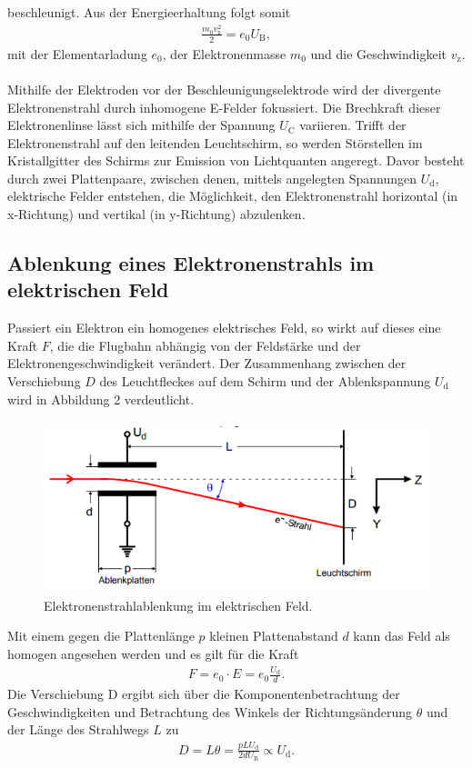 beschleunigt. Aus der Energieerhaltung folgt somit
\begin{align}
\frac{m_\text{0} v_\text{z}^{2}}{2} = e_\text{0} U_\text{B},
\end{align}
mit der Elementarladung $e_\text{0}$, der Elektronenmasse $m_\text{0}$ und die Geschwindigkeit
$v_\text{z}$. \\~\\
Mithilfe der Elektroden vor der Beschleunigungselektrode wird der divergente Elektronenstrahl 
durch inhomogene E-Felder fokussiert. Die Brechkraft dieser Elektronenlinse lässt sich mithilfe 
der Spannung $U_\text{C}$ variieren. Trifft der Elektronenstrahl auf den leitenden Leuchtschirm, so werden
Störstellen im Kristallgitter des Schirms zur Emission von Lichtquanten angeregt. Davor besteht durch
zwei Plattenpaare, zwischen denen, mittels angelegten Spannungen $U_\text{d}$, elektrische Felder entstehen,
 die Möglichkeit, den Elektronenstrahl horizontal (in x-Richtung) und vertikal (in y-Richtung) abzulenken.

 \subsection{Ablenkung eines Elektronenstrahls im elektrischen Feld}
Passiert ein Elektron ein homogenes elektrisches Feld, so wirkt auf dieses eine Kraft $F$, die die
Flugbahn abhängig von der Feldstärke und der Elektronengeschwindigkeit verändert. 
Der Zusammenhang zwischen der Verschiebung $D$ des Leuchtfleckes auf dem Schirm und der
Ablenkspannung $U_\text{d}$ wird in Abbildung 2 verdeutlicht.
\begin{figure}[H]
  \centering
  \includegraphics[height=5cm]{ablenkung1.png}
  \caption{Elektronenstrahlablenkung im elektrischen Feld. \cite[S.3]{kent}}
\end{figure}
Mit einem gegen die Plattenlänge $p$ kleinen Plattenabstand $d$ kann das Feld als homogen angesehen
werden und es gilt für die Kraft
\begin{align}
F = e_\text{0} \cdot E = e_\text{0} \frac{U_\text{d}}{d}.
\end{align}
Die Verschiebung D ergibt sich über die Komponentenbetrachtung der Geschwindigkeiten und Betrachtung
des Winkels der Richtungsänderung $\theta$ und der Länge des Strahlwegs $L$  zu
\begin{align}
D = L \theta = \frac{p L U_\text{d}}{2 d U_\text{B}} \propto U_\text{d}.
\end{align}

